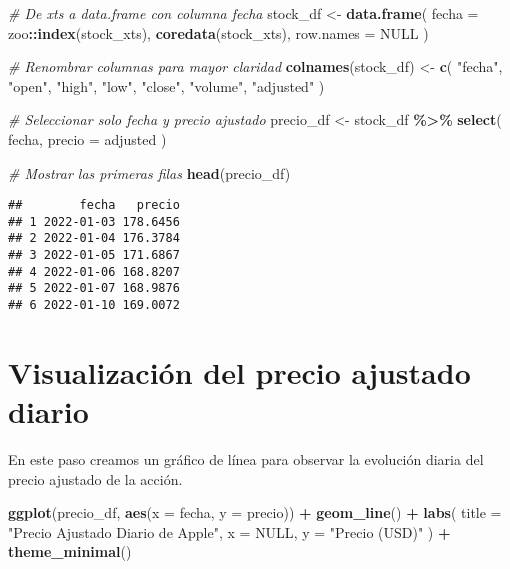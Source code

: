 \documentclass[
  11pt,
]{book}
\newenvironment{Shaded}{\begin{snugshade}}{\end{snugshade}}
\newcommand{\AttributeTok}[1]{\textcolor[rgb]{0.13,0.29,0.53}{#1}}
\newcommand{\CommentTok}[1]{\textcolor[rgb]{0.56,0.35,0.01}{\textit{#1}}}
\newcommand{\ConstantTok}[1]{\textcolor[rgb]{0.56,0.35,0.01}{#1}}
\newcommand{\FunctionTok}[1]{\textcolor[rgb]{0.13,0.29,0.53}{\textbf{#1}}}
\newcommand{\NormalTok}[1]{#1}
\newcommand{\OtherTok}[1]{\textcolor[rgb]{0.56,0.35,0.01}{#1}}
\newcommand{\SpecialCharTok}[1]{\textcolor[rgb]{0.81,0.36,0.00}{\textbf{#1}}}
\newcommand{\StringTok}[1]{\textcolor[rgb]{0.31,0.60,0.02}{#1}}
\begin{document}
\begin{Shaded}
\begin{Highlighting}[]
\CommentTok{\# De xts a data.frame con columna \textquotesingle{}fecha\textquotesingle{}}
\NormalTok{stock\_df }\OtherTok{\textless{}{-}} \FunctionTok{data.frame}\NormalTok{(}
  \AttributeTok{fecha =}\NormalTok{ zoo}\SpecialCharTok{::}\FunctionTok{index}\NormalTok{(stock\_xts),}
  \FunctionTok{coredata}\NormalTok{(stock\_xts),}
  \AttributeTok{row.names =} \ConstantTok{NULL}
\NormalTok{)}

\CommentTok{\# Renombrar columnas para mayor claridad}
\FunctionTok{colnames}\NormalTok{(stock\_df) }\OtherTok{\textless{}{-}} \FunctionTok{c}\NormalTok{(}
  \StringTok{"fecha"}\NormalTok{,}
  \StringTok{"open"}\NormalTok{, }\StringTok{"high"}\NormalTok{, }\StringTok{"low"}\NormalTok{, }\StringTok{"close"}\NormalTok{, }\StringTok{"volume"}\NormalTok{, }\StringTok{"adjusted"}
\NormalTok{)}

\CommentTok{\# Seleccionar solo fecha y precio ajustado}
\NormalTok{precio\_df }\OtherTok{\textless{}{-}}\NormalTok{ stock\_df }\SpecialCharTok{\%\textgreater{}\%}
  \FunctionTok{select}\NormalTok{(}
\NormalTok{    fecha,}
    \AttributeTok{precio =}\NormalTok{ adjusted}
\NormalTok{  )}

\CommentTok{\# Mostrar las primeras filas}
\FunctionTok{head}\NormalTok{(precio\_df)}
\end{Highlighting}
\end{Shaded}

\begin{verbatim}
##        fecha   precio
## 1 2022-01-03 178.6456
## 2 2022-01-04 176.3784
## 3 2022-01-05 171.6867
## 4 2022-01-06 168.8207
## 5 2022-01-07 168.9876
## 6 2022-01-10 169.0072
\end{verbatim}

\section{Visualización del precio ajustado diario}\label{visualizaciuxf3n-del-precio-ajustado-diario}

En este paso creamos un gráfico de línea para observar la evolución diaria del precio ajustado de la acción.

\begin{Shaded}
\begin{Highlighting}[]
\FunctionTok{ggplot}\NormalTok{(precio\_df, }\FunctionTok{aes}\NormalTok{(}\AttributeTok{x =}\NormalTok{ fecha, }\AttributeTok{y =}\NormalTok{ precio)) }\SpecialCharTok{+}
  \FunctionTok{geom\_line}\NormalTok{() }\SpecialCharTok{+}
  \FunctionTok{labs}\NormalTok{(}
    \AttributeTok{title =} \StringTok{"Precio Ajustado Diario de Apple"}\NormalTok{,}
    \AttributeTok{x     =} \ConstantTok{NULL}\NormalTok{,}
    \AttributeTok{y     =} \StringTok{"Precio (USD)"}
\NormalTok{  ) }\SpecialCharTok{+}
  \FunctionTok{theme\_minimal}\NormalTok{()}
\end{Highlighting}
\end{Shaded}
\end{document}
